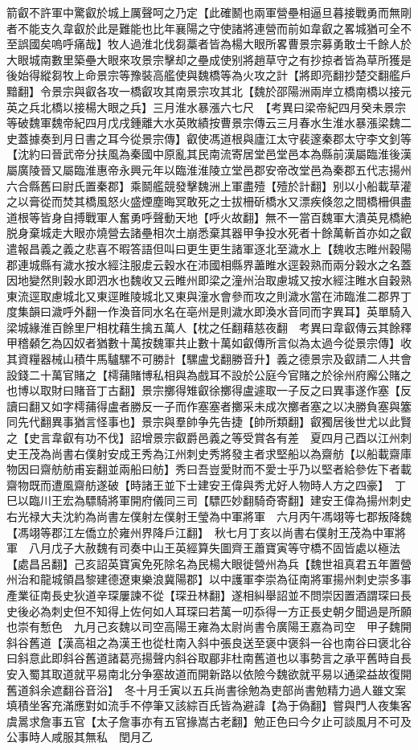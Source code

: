 箭叡不許軍中驚叡於城上厲聲呵之乃定【此確鬭也兩軍營壘相逼旦暮接戰勇而無剛者不能支久韋叡於此是難能也比年襄陽之守使諸將連營而前如韋叡之畧城猶可全不至誤國矣嗚呼痛哉】牧人過淮北伐芻藁者皆為楊大眼所畧曹景宗募勇敢士千餘人於大眼城南數里築壘大眼來攻景宗擊却之壘成使别將趙草守之有抄掠者皆為草所獲是後始得縱芻牧上命景宗等豫裝高艦使與魏橋等為火攻之計【將即亮翻抄楚交翻艦戶黯翻】令景宗與叡各攻一橋叡攻其南景宗攻其北【魏於邵陽洲兩岸立橋南橋以接元英之兵北橋以接楊大眼之兵】三月淮水暴漲六七尺　【考異曰梁帝紀四月癸未景宗等破魏軍魏帝紀四月戊戌鍾離大水英敗績按曹景宗傳云三月春水生淮水暴漲梁魏二史蓋據奏到月日書之耳今從景宗傳】叡使馮道根與廬江太守裴邃秦郡太守李文釗等【沈約曰晉武帝分扶風為秦國中原亂其民南流寄居堂邑堂邑本為縣前漢屬臨淮後漢屬廣陵晉又屬臨淮惠帝永興元年以臨淮淮陵立堂邑郡安帝改堂邑為秦郡五代志揚州六合縣舊曰尉氏置秦郡】乘鬬艦競發擊魏洲上軍盡殪【殪於計翻】别以小船載草灌之以膏從而焚其橋風怒火盛煙塵晦冥敢死之士拔柵斫橋水又漂疾倏忽之間橋柵俱盡道根等皆身自搏戰軍人奮勇呼聲動天地【呼火故翻】無不一當百魏軍大潰英見橋絶脱身棄城走大眼亦燒營去諸壘相次土崩悉棄其器甲争投水死者十餘萬斬首亦如之叡遣報昌義之義之悲喜不暇答語但叫曰更生更生諸軍逐北至濊水上【魏收志睢州穀陽郡連城縣有濊水按水經注服䖍云穀水在沛國相縣界藎睢水逕穀熟而兩分穀水之名蓋因地變然則穀水即泗水也魏收又云睢州即梁之潼州治取慮城又按水經注睢水自穀熟東流逕取慮城北又東逕睢陵城北又東與潼水會參而攻之則濊水當在沛臨淮二郡界丁度集韻曰濊呼外翻一作渙音同水名在亳州是則濊水即渙水音同而字異耳】英單騎入梁城緣淮百餘里尸相枕藉生擒五萬人【枕之任翻藉慈夜翻　考異曰韋叡傳云其餘釋甲稽顙乞為囚奴者猶數十萬按魏軍共止數十萬如叡傳所言似為太過今從景宗傳】收其資糧器械山積牛馬驢騾不可勝計【騾盧戈翻勝音升】義之德景宗及叡請二人共會設錢二十萬官賭之【樗蒱賭博私相與為戲耳不設於公庭今官賭之於徐州府廨公賭之也博以取財曰賭音丁古翻】景宗擲得雉叡徐擲得盧遽取一子反之曰異事遂作塞【反讀曰翻又如字樗蒱得盧者勝反一子而作塞塞者擲采未成次擲者塞之以决勝負塞與簺同先代翻異事猶言怪事也】景宗與羣帥争先告捷【帥所類翻】叡獨居後世尤以此賢之【史言韋叡有功不伐】詔增景宗叡爵邑義之等受賞各有差　夏四月己酉以江州刺史王茂為尚書右僕射安成王秀為江州刺史秀將發主者求堅船以為齋舫【以船載齋庫物因曰齋舫舫甫妄翻並兩船曰舫】秀曰吾豈愛財而不愛士乎乃以堅者給參佐下者載齋物既而遭風齋舫遂破【時諸王並下士建安王偉與秀尤好人物時人方之四豪】　丁巳以臨川王宏為驃騎將軍開府儀同三司【驃匹妙翻騎奇寄翻】建安王偉為揚州刺史右光禄大夫沈約為尚書左僕射左僕射王瑩為中軍將軍　六月丙午馮翊等七郡叛降魏【馮翊等郡江左僑立於雍州界降戶江翻】　秋七月丁亥以尚書右僕射王茂為中軍將軍　八月戊子大赦魏有司奏中山王英經算失圖齊王蕭寶寅等守橋不固皆處以極法【處昌呂翻】己亥詔英寶寅免死除名為民楊大眼徙營州為兵【魏世祖真君五年置營州治和龍城領昌黎建德遼東樂浪冀陽郡】以中護軍李崇為征南將軍揚州刺史崇多事產業征南長史狄道辛琛屢諫不從【琛丑林翻】遂相糾舉詔並不問崇因置酒謂琛曰長史後必為刺史但不知得上佐何如人耳琛曰若萬一叨忝得一方正長史朝夕聞過是所願也崇有慙色　九月己亥魏以司空高陽王雍為太尉尚書令廣陽王嘉為司空　甲子魏開斜谷舊道【漢高祖之為漢王也從杜南入斜中張良送至褒中褒斜一谷也南谷曰褒北谷曰斜意此即斜谷舊道諸葛亮揚聲内斜谷取郿非杜南舊道也以事勢言之承平舊時自長安入蜀其取道就平易南北分争塞故道而開新路以依險今魏欲就平易以通梁益故復開舊道斜余遮翻谷音浴】　冬十月壬寅以五兵尚書徐勉為吏部尚書勉精力過人雖文案填積坐客充滿應對如流手不停筆又該綜百氏皆為避諱【為于偽翻】嘗與門人夜集客虞暠求詹事五官【太子詹事亦有五官掾嵩古老翻】勉正色曰今夕止可談風月不可及公事時人咸服其無私　閏月乙